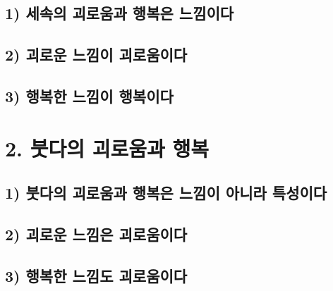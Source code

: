 \documentclass[12pt, a4paper, oneside]{book}
\begin{document}
	\newpage  \null
	\section{1) 세속의 괴로움과 행복은 느낌이다}

	\newpage  \null
	\section{2) 괴로운 느낌이 괴로움이다}

	\newpage  \null
	\section{3) 행복한 느낌이 행복이다}

	\newpage
	\chapter{2. 붓다의 괴로움과 행복}
		\newpage
		\minitoc				%


	\newpage  \null
	\section{1) 붓다의 괴로움과 행복은 느낌이 아니라 특성이다}

	\newpage  \null
	\section{2) 괴로운 느낌은 괴로움이다}

	\newpage  \null
	\section{3) 행복한 느낌도 괴로움이다}

	\newpage  \null
\end{document}
